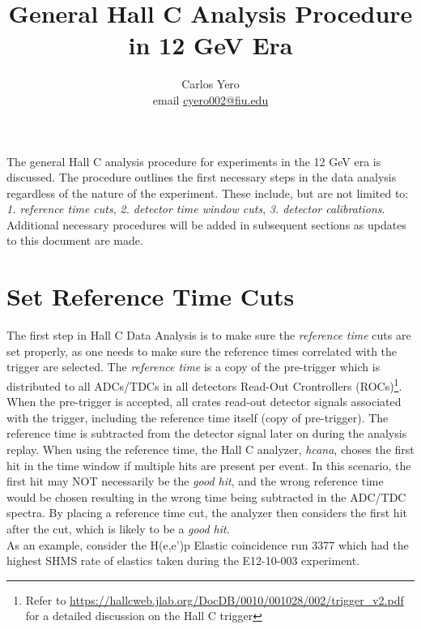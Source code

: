 \documentclass[14pt]{article}
\begin{document}
 
 
\title{\textbf{General Hall C Analysis Procedure in 12 GeV Era}}%
\author{Carlos Yero \\ email \href{mailto:cyero002@fiu.edu}{cyero002@fiu.edu}} %
 
\maketitle
\noindent The general Hall C analysis procedure for experiments in the 12 GeV era is discussed. The procedure
outlines the first necessary steps in the data analysis regardless of the nature of the experiment. These include, but are not
limited to: \\ \textit{1. reference time cuts}, \textit{2. detector time window cuts}, \textit{3. detector calibrations}.
Additional necessary procedures will be added in subsequent sections as updates to this document are made.

\section{Set Reference Time Cuts}
\noindent The first step in Hall C Data Analysis is to make sure the \textit{reference time}  cuts are set properly,
as one needs to make sure the reference times correlated with the trigger are selected. The \textit{reference time}
is a copy of the pre-trigger which is distributed to all ADCs/TDCs in all detectors Read-Out Crontrollers (ROCs)\footnote{Refer to \url{https://hallcweb.jlab.org/DocDB/0010/001028/002/trigger_v2.pdf} for a detailed discussion on the Hall C trigger}. When the pre-trigger
is accepted, all crates read-out detector signals associated with the trigger, including the reference time itself (copy of pre-trigger). The
reference time is subtracted from the detector signal later on during the analysis replay. When using the reference time,
the Hall C analyzer, \textit{hcana}, choses the first hit in the time window if multiple hits are present per event. In this scenario, the first hit may NOT
necessarily be the \textit{good hit}, and the wrong reference time would be chosen resulting in the wrong time being subtracted in the ADC/TDC spectra.
By placing a reference time cut, the analyzer then considers the first hit after the cut, which is likely to be a \textit{good hit}. \\
\indent As an example, consider the H(e,e')p Elastic coincidence run 3377 which had the highest SHMS rate of elastics taken during the E12-10-003 experiment.
\end{document}
